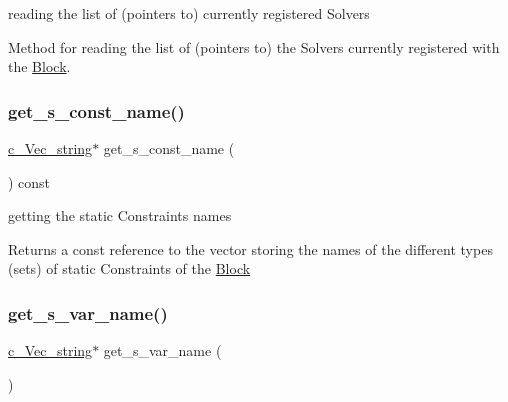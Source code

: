 reading the list of (pointers to) currently registered Solvers 

Method for reading the list of (pointers to) the Solvers currently registered with the \mbox{\hyperlink{class_s_m_spp__di__unipi__it_1_1_block}{Block}}. \mbox{\label{class_s_m_spp__di__unipi__it_1_1_block_a24cb4ebbb818387a98bb47c10697617e}} 
\subsubsection{\texorpdfstring{get\+\_\+s\+\_\+const\+\_\+name()}{get\_s\_const\_name()}}
{\footnotesize\ttfamily \mbox{\hyperlink{group___s_m_s__types_ga4eb8b5e087882b48fc77ba2a18267301}{c\+\_\+\+Vec\+\_\+string}}$\ast$ get\+\_\+s\+\_\+const\+\_\+name (\begin{DoxyParamCaption}\item[{void}]{ }\end{DoxyParamCaption}) const\hspace{0.3cm}{\ttfamily [inline]}}



getting the static Constraints\textquotesingle{} names 

Returns a const reference to the vector storing the names of the different types (sets) of static Constraints of the \mbox{\hyperlink{class_s_m_spp__di__unipi__it_1_1_block}{Block}} \mbox{\label{class_s_m_spp__di__unipi__it_1_1_block_ab9d6ff0f07fa37614173afbccbc71f31}} 
\subsubsection{\texorpdfstring{get\+\_\+s\+\_\+var\+\_\+name()}{get\_s\_var\_name()}}
{\footnotesize\ttfamily \mbox{\hyperlink{group___s_m_s__types_ga4eb8b5e087882b48fc77ba2a18267301}{c\+\_\+\+Vec\+\_\+string}}$\ast$ get\+\_\+s\+\_\+var\+\_\+name (\begin{DoxyParamCaption}\item[{void}]{ }\end{DoxyParamCaption})\hspace{0.3cm}{\ttfamily [inline]}}



